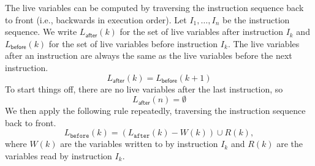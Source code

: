 \documentclass[11pt]{book}
\begin{document}
The live variables can be computed by traversing the instruction
sequence back to front (i.e., backwards in execution order).  Let
$I_1,\ldots, I_n$ be the instruction sequence. We write
$L_{\mathsf{after}}(k)$ for the set of live variables after
instruction $I_k$ and $L_{\mathsf{before}}(k)$ for the set of live
variables before instruction $I_k$. The live variables after an
instruction are always the same as the live variables before the next
instruction.
\begin{equation} \label{eq:live-after-before-next}
  L_{\mathsf{after}}(k) = L_{\mathsf{before}}(k+1)
\end{equation}
To start things off, there are no live variables after the last
instruction, so
\begin{equation}\label{eq:live-last-empty}
  L_{\mathsf{after}}(n) = \emptyset
\end{equation}
We then apply the following rule repeatedly, traversing the
instruction sequence back to front.
\begin{equation}\label{eq:live-before-after-minus-writes-plus-reads}
  L_{\mathtt{before}}(k) = (L_{\mathtt{after}}(k) - W(k)) \cup R(k),
\end{equation}
where $W(k)$ are the variables written to by instruction $I_k$ and
$R(k)$ are the variables read by instruction $I_k$.
\end{document}
